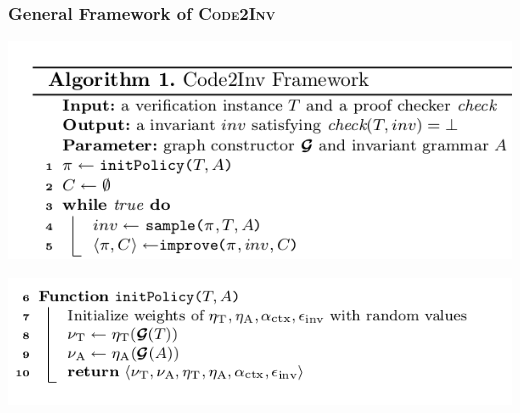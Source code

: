 \documentclass[11pt]{beamer}
\begin{document}
\begin{frame}\frametitle{General Framework of \textsc{Code2Inv}}
\begin{center}
\includegraphics[scale=0.5]{algoMain.png}

\includegraphics[scale=0.5]{algoInit.png}
\end{center}
\end{frame}
\end{document}
